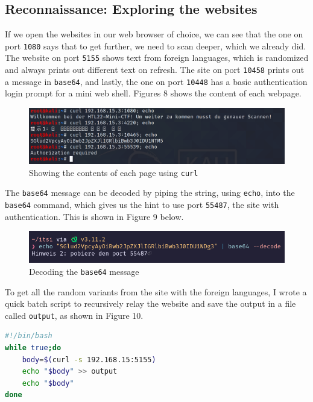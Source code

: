 \documentclass[a4paper]{article}
\newcommand{\abc}{\hfill \break}
\begin{document}
\subsection{Reconnaissance: Exploring the websites}
If we open the websites in our web browser of choice, we can see that the one on port \texttt{1080} says that to get further, we need to scan deeper, which we already did. The website on port \texttt{5155} shows text from foreign languages, which is randomized and always prints out different text on refresh. The site on port \texttt{10458} prints out a message in \texttt{base64}, and lastly, the one on port \texttt{10448} has a basic authentication login prompt for a mini web shell. Figures 8 shows the content of each webpage.
\newpage
\begin{figure}[h]
	\includegraphics[scale=0.25]{images/allesiten.png}
	\centering
	\caption[a]{Showing the contents of each page using \texttt{curl} \footnotemark}
\end{figure}\abc
{}
The \texttt{base64} message can be decoded by piping the string, using \texttt{echo}, into the \texttt{base64} command, which gives us the hint to use port \texttt{55487}, the site with authentication. This is shown in Figure 9 below.
\begin{figure}[h]
	\includegraphics[scale=0.4]{images/base64.png}
	\centering
	\caption{Decoding the \texttt{base64} message}
\end{figure}\abc
To get all the random variants from the site with the foreign languages, I wrote a quick batch script to recursively relay the website and save the output in a file called \texttt{output}, as shown in Figure 10.
\begin{lstlisting}[language=bash]
#!/bin/bash
while true;do
    body=$(curl -s 192.168.15:5155)
    echo "$body" >> output
    echo "$body"
done
\end{lstlisting}
\end{document}
